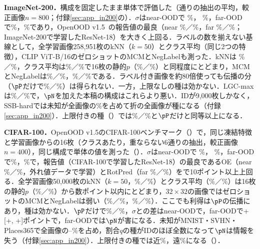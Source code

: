\textbf{ImageNet-200．}構成を固定したまま単体で評価した（\NInTwoZeroZeroNDraws{}通りの抽出の平均，較正画像$n{=}800$；付録\ref{sec:app_in200}の）．$\sigma$はnear-OODで\AUC{} \NInTwoZeroZeroMainNearAuroc\%，\FPR{} \NInTwoZeroZeroMainNearFpr\%，far-OODで\NInTwoZeroZeroMainFarAuroc\%，\NInTwoZeroZeroMainFarFpr\%であり，OpenOOD v1.5~\cite{zhang2023openood}の報告値の最良（near \NInTwoZeroZeroBestPubNearAuroc\%／\NInTwoZeroZeroBestPubNearFpr\%，far \NInTwoZeroZeroBestPubFarAuroc\%／\NInTwoZeroZeroBestPubFarFpr\%；ImageNet-200で学習したResNet-18）を大きく上回る．ラベルの数を揃えない基線として，全学習画像258,951枚のkNN（$k{=}50$）とクラス平均（同じ2つの特徴），CLIP ViT-B/16のゼロショットのMCMとNegLabelも測った．kNNは\FPR{} \NInTwoZeroZeroKnnAllKFiveZeroNearFpr\%／\NInTwoZeroZeroKnnAllKFiveZeroFarFpr\%，クラス平均は\NInTwoZeroZeroNcmAllNearFpr\%／\NInTwoZeroZeroNcmAllFarFpr\%で16枚の静的$p$（\NInTwoZeroZeroStaticNearFpr\%／\NInTwoZeroZeroStaticFarFpr\%）と同程度にとどまり，MCMとNegLabelは\NInTwoZeroZeroMcmClipNearFpr\%／\NInTwoZeroZeroMcmClipFarFpr\%，\NInTwoZeroZeroNeglabelClipNearFpr\%／\NInTwoZeroZeroNeglabelClipFarFpr\%である．ラベル付き画像を約80倍使っても伝播の分（$\pP$だけで\NInTwoZeroZeroLpNearFpr\%／\NInTwoZeroZeroLpFarFpr\%）は得られない．一方，上限なしの種は効かない．LGC-maxは\NInTwoZeroZeroLgcNearFpr\%／\NInTwoZeroZeroLgcFarFpr\%で，$\pN$を加えた本稿の構成はこれらより悪い．IDが9,000枚しかなく，SSB-hardでは未知が全画像の\NInTwoZeroZeroMixSsbHard\%を占めて折の全画像が種になる（付録\ref{sec:app_in200}）．上限付きの種（）では\NInTwoZeroZeroStoreycNearFpr\%／\NInTwoZeroZeroStoreycFarFpr\%と$\pP$だけと同等以上になる．

\textbf{CIFAR-100．}OpenOOD v1.5のCIFAR-100ベンチマーク（）で，同じ凍結特徴と学習画像からの16枚（クラスあたり，重ならない6通りの抽出，較正画像$n{=}400$），同じ構成で単体の値を測った（）．$\sigma$はnear-OODで\AUC{} \NCifarMainNearAuroc\%，\FPR{} \NCifarMainNearFpr\%，far-OODで\NCifarMainFarAuroc\%，\NCifarMainFarFpr\%で，報告値（CIFAR-100で学習したResNet-18）の最良であるOE（near \NCifarBestPubNearAuroc\%／\NCifarBestPubNearFpr\%，外れ値データで学習）とRotPred（far \NCifarBestPubFarAuroc\%／\NCifarBestPubFarFpr\%）を\AUC{}で10ポイント以上上回る．全学習画像50,000枚のkNN（$k{=}50$，\NCifarKnnAllKFiveZeroNearFpr\%／\NCifarKnnAllKFiveZeroFarFpr\%）とクラス平均（\NCifarNcmAllNearFpr\%／\NCifarNcmAllFarFpr\%）は16枚の静的$p$（\NCifarStaticNearFpr\%／\NCifarStaticFarFpr\%）から数ポイント以内にとどまり，$32\times32$の画像ではゼロショットのMCMとNegLabelは弱い（\NCifarMcmClipNearFpr\%／\NCifarMcmClipFarFpr\%，\NCifarNeglabelClipNearFpr\%／\NCifarNeglabelClipFarFpr\%）．ここでも利得は$\pP$の伝播にあり，種は効かない．$\pP$だけで\NCifarLpNearFpr\%／\NCifarLpFarFpr\%，$\sigma$との差はnear-OODで\NCifarMainNearDfprVsLp{}，far-OODで+\NCifarMainFarDfprVsLp{} [+\NCifarMainFarDfprVsLpLo, +\NCifarMainFarDfprVsLpHi]ポイントで，far-OODでは$\pN$が害になる．未知がMNIST・SVHN・Places365で全画像の\NCifarMixFarHiMin{}--\NCifarMixFarHiMax\%を占め，割合$q$の種がIDのほぼ全数になって$\pN$は情報を失う（付録\ref{sec:app_in200}）．上限付きの種では近\NCifarStoreycNearFpr\%，遠\NCifarStoreycFarFpr\%になる（）．
